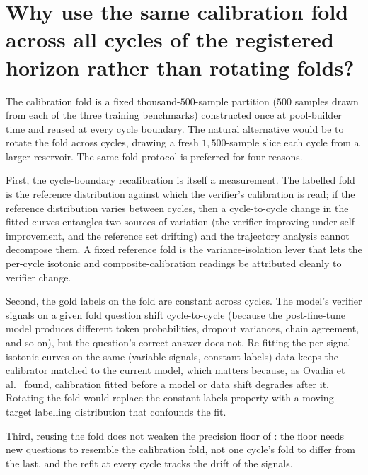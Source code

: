 
\section[Same calibration fold across cycles]{Why use the same calibration fold across all cycles of the registered horizon rather than rotating folds?}
\label{app:qa-same-fold}

The calibration fold is a fixed thousand-$500$-sample partition ($500$ samples drawn from each of the three training benchmarks) constructed once at pool-builder time and reused at every cycle boundary. The natural alternative would be to rotate the fold across cycles, drawing a fresh $1{,}500$-sample slice each cycle from a larger reservoir. The same-fold protocol is preferred for four reasons.

First, the cycle-boundary recalibration is itself a measurement. The labelled fold is the reference distribution against which the verifier's calibration is read; if the reference distribution varies between cycles, then a cycle-to-cycle change in the fitted curves entangles two sources of variation (the verifier improving under self-improvement, and the reference set drifting) and the trajectory analysis cannot decompose them. A fixed reference fold is the variance-isolation lever that lets the per-cycle isotonic and composite-calibration readings be attributed cleanly to verifier change.

Second, the gold labels on the fold are constant across cycles. The model's verifier signals on a given fold question shift cycle-to-cycle (because the post-fine-tune model produces different token probabilities, dropout variances, chain agreement, and so on), but the question's correct answer does not. Re-fitting the per-signal isotonic curves on the same (variable signals, constant labels) data keeps the calibrator matched to the current model, which matters because, as Ovadia et al.~\cite{ovadia2019trust} found, calibration fitted before a model or data shift degrades after it. Rotating the fold would replace the constant-labels property with a moving-target labelling distribution that confounds the fit.

Third, reusing the fold does not weaken the precision floor of : the floor needs new questions to resemble the calibration fold, not one cycle's fold to differ from the last, and the refit at every cycle tracks the drift of the signals.

